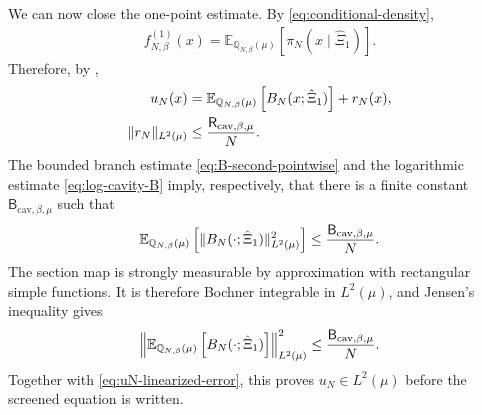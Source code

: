 \documentclass[11pt,reqno]{amsart}
\numberwithin{equation}{section}
\theoremstyle{plain}
\theoremstyle{remark}
\DeclarePairedDelimiter{\norm}{\lVert}{\rVert}
\newcommand{\E}{{\mathbb{E}}}
\newcommand{\Q}{{\mathbb{Q}}}
\newcommand{\be}{\beta}
\begin{document}
We can now close the one-point estimate.  By \eqref{eq:conditional-density},
\begin{align}\label{eq:one-point-density-conditional-average}
 f_{N,\be}^{(1)}(x)=\E_{\Q_{N,\be}(\mu)}\left[\pi_N(x\mid\hat\Xi_1)\right].
\end{align}
Therefore, by ,
\begin{subequations}\label{eq:uN-linearized}
\begin{align}
 u_N(x)&=\E_{\Q_{N,\be}(\mu)}\left[B_N(x;\hat\Xi_1)\right]+r_N(x),\label{eq:uN-linearized-identity}\\
 \norm{r_N}_{L^2(\mu)}&\le \frac{\mathsf R_{\mathrm{cav},\be,\mu}}{N}.\label{eq:uN-linearized-error}
\end{align}
\end{subequations}
The bounded branch estimate \eqref{eq:B-second-pointwise} and the logarithmic estimate \eqref{eq:log-cavity-B} imply, respectively, that there is a finite constant \(\mathsf B_{\mathrm{cav},\be,\mu}\) such that
\begin{align}\label{eq:expected-cavity-square}
 \E_{\Q_{N,\be}(\mu)}\left[
 \norm{B_N(\cdot;\hat\Xi_1)}_{L^2(\mu)}^2
 \right]
 \le \frac{\mathsf B_{\mathrm{cav},\be,\mu}}{N}.
\end{align}
The section map is strongly measurable by approximation with rectangular simple functions.  It is therefore Bochner integrable in \(L^2(\mu)\), and Jensen's inequality gives
\begin{align}\label{eq:averaged-cavity-L2-preliminary}
 \norm*{\E_{\Q_{N,\be}(\mu)}\left[B_N(\cdot;\hat\Xi_1)\right]}_{L^2(\mu)}^2
 \le \frac{\mathsf B_{\mathrm{cav},\be,\mu}}{N}.
\end{align}
Together with \eqref{eq:uN-linearized-error}, this proves \(u_N\in L^2(\mu)\) before the screened equation is written.
\end{document}
